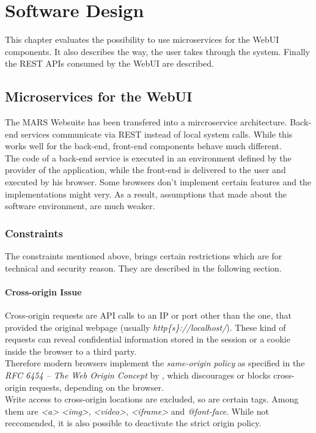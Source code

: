 
\chapter{Software Design}
This chapter evaluates the possibility to use microservices for the WebUI components. It also describes the way, the user takes through the system. Finally the REST APIs consumed by the WebUI are described.



\section{Microservices for the WebUI}
\label{sec:MS_for_WebUI}
The MARS Websuite has been transfered into a mircroservice architecture. Back-end services communicate via REST instead of local system calls. While this works well for the back-end, front-end components behave much different.\\
The code of a back-end service is executed in an environment defined by the provider of the application, while the front-end is delivered to the user and executed by his browser. Some browsers don't implement certain features and the implementations might very. As a result, assumptions that made about the software environment, are much weaker. 


\subsection{Constraints}
The constraints mentioned above, brings certain restrictions which are for technical and security reason. They are described in the following section.

\subsubsection{Cross-origin Issue}
Cross-origin requests are API calls to an IP or port other than the one, that provided the original webpage (usually \textit{http\{s\}://localhost/}). These kind of requests can reveal confidential information stored in the session or a cookie inside the browser to a third party.\\
Therefore modern browsers implement the \textit{same-origin policy} as specified in the \textit{RFC 6454 -- The Web Origin Concept} by \cite{barth2011web}, which discourages or blocks cross-origin requests, depending on the browser.\\
Write access to cross-origin locations are excluded, so are certain tags. Among them are \textit{<a>} \textit{<img>}, \textit{<video>}, \textit{<iframe>} and \textit{@font-face}. While not reccomended, it is also possible to deactivate the strict origin policy.

